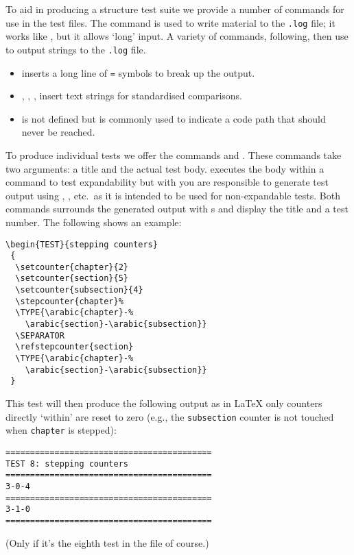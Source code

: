 \documentclass[a4paper]{ltugboat}
\begin{document}
To aid in producing a structure test suite we provide a number of
commands for use in the test files.  The  command is used to write
material to the \texttt{.log} file; it works like , but it
allows `long' input.
%
A variety of commands, following, then use  to output strings
to the \texttt{.log} file.
\begin{itemize}
\item
{} inserts a long line of \texttt{=} symbols to break up
the output.
\item
{}, , ,  insert text strings for standardised comparisons.
\item
{} is not defined but is commonly used to indicate a code path
that should never be reached.
\end{itemize}
To produce individual tests we offer the commands  and
. These commands take two arguments: a title
and the actual test body.   executes the body within a
 command to test expandability but with  you are
responsible to generate test output using , ,
etc.\ as it is intended to be used for non-expandable tests.
Both  commands  surrounds the generated output with s and 
display the title and a test number. The following shows an example:
\begin{Verbatim}
\begin{TEST}{stepping counters}
 {
  \setcounter{chapter}{2}
  \setcounter{section}{5}
  \setcounter{subsection}{4}
  \stepcounter{chapter}%
  \TYPE{\arabic{chapter}-%
    \arabic{section}-\arabic{subsection}}
  \SEPARATOR
  \refstepcounter{section}
  \TYPE{\arabic{chapter}-%
    \arabic{section}-\arabic{subsection}}
 }
\end{Verbatim}
This test will then produce the following output as in \LaTeX{} only
counters directly `within' are reset to zero (e.g., the
\texttt{subsection} counter is not touched when \texttt{chapter} is stepped):
\begin{Verbatim}
==========================================
TEST 8: stepping counters
==========================================
3-0-4
==========================================
3-1-0
==========================================
\end{Verbatim}
(Only if it's the eighth test in the file of course.)



\end{document}
